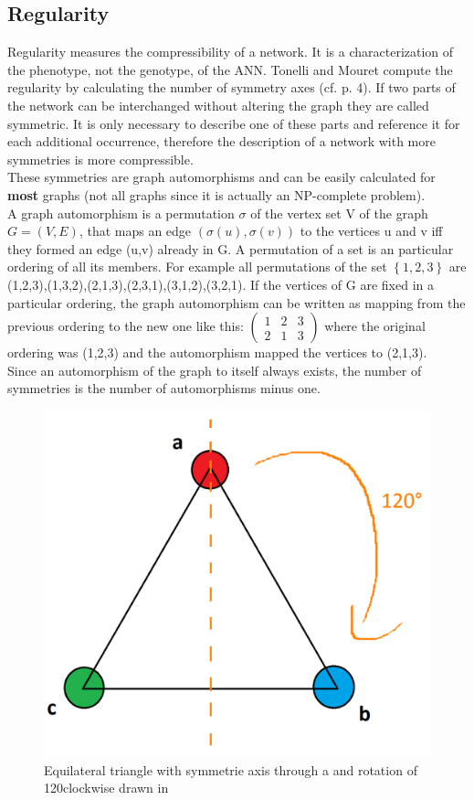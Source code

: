 \documentclass[12pt,twoside]{article}
\theoremstyle{plain}
\theoremstyle{definition}
\theoremstyle{remark}
\begin{document}
\subsection{Regularity}
\label{regularity}
Regularity measures the compressibility of a network. It is a characterization of the phenotype, not the genotype, of the ANN.
Tonelli and Mouret compute the regularity by calculating the number of symmetry axes (cf. \cite{citeulike:12788284} p. 4).
If two parts of the network can be interchanged without altering the graph they are called symmetric.
It is only necessary to describe one of these parts and reference it for each additional occurrence, therefore the description of a network with more symmetries is more compressible.\\
These symmetries are graph automorphisms and can be easily calculated for \textbf{most} graphs (not all graphs since it is actually an NP-complete problem).\\
A graph automorphism is a permutation $\sigma$ of the vertex set V of the graph $G = (V,E)$, that maps an edge $(\sigma(u),\sigma(v))$ to the vertices u and v iff they formed an edge (u,v) already in G. A permutation of a set is an particular ordering of all its members. For example all permutations of the set $\left\{ 1,2,3 \right\}$ are (1,2,3),(1,3,2),(2,1,3),(2,3,1),(3,1,2),(3,2,1). If the vertices of G are fixed in a particular ordering, the graph automorphism can be written as mapping from the previous ordering to the new one like this: 
$
\begin{pmatrix}
1 & 2 & 3 \\
2 & 1 & 3
\end{pmatrix}
$ where the original ordering was (1,2,3) and the automorphism mapped the vertices to (2,1,3).\\
Since an automorphism of the graph to itself always exists, the number of symmetries is the number of automorphisms minus one.\medskip

\begin{figure}[!b]
	\begin{center}
		\includegraphics[width=.43\textwidth]{GleichseitigUndGeschmeidig.png}
	\end{center}
	\caption{Equilateral triangle with symmetrie axis through a and rotation of 120\degree clockwise drawn in}
	\label{fig:dreieck}
\end{figure}
\end{document}
